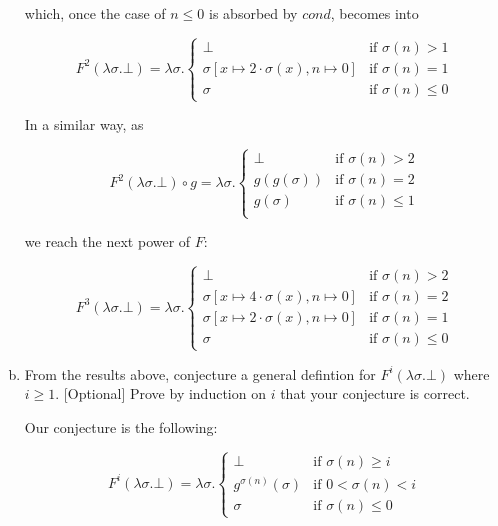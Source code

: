 \documentclass{article}
\begin{document}
\begin{enumerate}[(a)]
    which, once the case of $n \leq 0$ is absorbed by
    $cond$, becomes into

    $$F^2\left(\lambda\sigma.\bot\right) 
      = \lambda\sigma.\begin{cases}
        \bot & \text{if } \sigma(n) > 1 \\
        \sigma
          \left[
            x \mapsto 2 \cdot \sigma(x),
            n \mapsto 0
          \right] & \text{if } \sigma(n) = 1 \\
        \sigma & \text{if } \sigma(n) \leq 0
      \end{cases}
    $$

    In a similar way, as 

    $$F^2(\lambda\sigma.\bot) \circ g =
      \lambda\sigma. \begin{cases}
        \bot & \text{if } \sigma(n) > 2 \\ 
        g(g(\sigma)) & \text{if } \sigma(n) = 2 \\
        g(\sigma) & \text{if } \sigma(n) \leq 1 \\
      \end{cases}
    $$

    we reach the next power of $F$:

    $$F^3\left(\lambda\sigma.\bot\right) 
      = \lambda\sigma.\begin{cases}
        \bot & \text{if } \sigma(n) > 2 \\
        \sigma
          \left[
            x \mapsto 4 \cdot \sigma(x),
            n \mapsto 0
          \right] & \text{if } \sigma(n) = 2 \\
        \sigma
          \left[
            x \mapsto 2 \cdot \sigma(x),
            n \mapsto 0
          \right] & \text{if } \sigma(n) = 1 \\
        \sigma & \text{if } \sigma(n) \leq 0
      \end{cases}
    $$

  \item From the results above, conjecture a general defintion for 
    $F^i\left(\lambda\sigma.\bot\right)$ where $i \geq 1$.
    [Optional] Prove by induction on $i$ that your conjecture is 
    correct.

    Our conjecture is the following:

    $$F^i\left(\lambda\sigma.\bot\right) 
      = \lambda\sigma.\begin{cases}
        \bot & \text{if } \sigma(n) \geq i \\
        g^{\sigma(n)}(\sigma) & \text{if } 0 < \sigma(n) < i \\
        \sigma & \text{if } \sigma(n) \leq 0
      \end{cases}
    $$


\end{enumerate}
\end{document}
